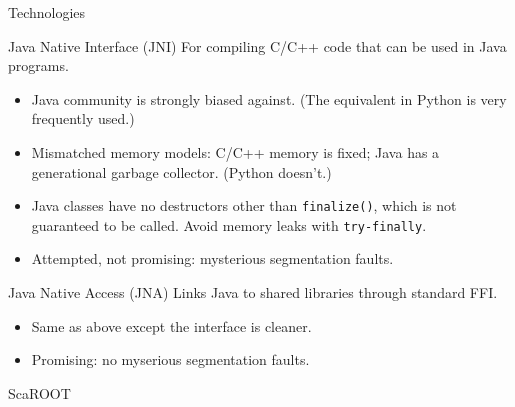 \documentclass{beamer}
\begin{document}
\begin{frame}{Technologies}
\begin{block}{Java Native Interface (JNI)}
For compiling C/C++ code that can be used in Java programs.
\begin{itemize}
\item Java community is strongly biased against. (The equivalent in Python is very frequently used.)
\item Mismatched memory models: C/C++ memory is fixed; Java has a generational garbage collector. (Python doesn't.)
\item Java classes have no destructors other than {\tt finalize()}, which is not guaranteed to be called. Avoid memory leaks with {\tt try-finally}.
\item Attempted, not promising: mysterious segmentation faults.
\end{itemize}
\end{block}

\begin{block}{Java Native Access (JNA)}
Links Java to shared libraries through standard FFI.
\begin{itemize}
\item Same as above except the interface is cleaner.
\item Promising: no myserious segmentation faults.
\end{itemize}
\end{block}
\end{frame}

\begin{frame}{ScaROOT}





\end{frame}
\end{document}
